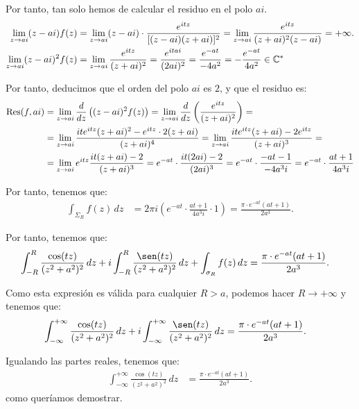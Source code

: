 \begin{ejercicio}
    Por tanto, tan solo hemos de calcular el residuo en el polo $ai$.
    \begin{align*}
        \lim_{z\to ai} (z - ai)f(z) &= \lim_{z\to ai} (z - ai)\cdot \frac{e^{i t z}}{[(z - ai)(z + ai)]^2}
        = \lim_{z\to ai} \frac{e^{i t z}}{(z + ai)^2(z - ai)} = +\infty.\\
        \lim_{z\to ai} (z - ai)^2f(z) &= \lim_{z\to ai} \frac{e^{i t z}}{(z + ai)^2}
        = \frac{e^{i t ai}}{(2ai)^2} = \frac{e^{-at}}{-4a^2} = -\frac{e^{-at}}{4a^2}\in \mathbb{C}^*
    \end{align*}

    Por tanto, deducimos que el orden del polo $ai$ es $2$, y que el residuo es:
    \begin{align*}
        \operatorname{Res}(f, ai) &= \lim_{z\to ai} \dfrac{d}{dz}\left((z - ai)^2f(z)\right)
        = \lim_{z\to ai} \dfrac{d}{dz}\left(\frac{e^{i t z}}{(z + ai)^2}\right)
        =\\&= \lim_{z\to ai} \frac{i t e^{i t z}(z + ai)^2 - e^{i t z}\cdot 2(z + ai)}{(z + ai)^4}
        = \lim_{z\to ai} \frac{i t e^{i t z}(z + ai) - 2e^{i t z}}{(z + ai)^3}
        =\\&=  \lim_{z\to ai} e^{i t z} \frac{i t (z + ai) - 2}{(z + ai)^3}
        = e^{-at}\cdot \dfrac{i t (2ai) - 2}{(2ai)^3}
        = e^{-at}\cdot \dfrac{-at -1}{-4a^3i}
        = e^{-at}\cdot \dfrac{at+1}{4a^3i}
    \end{align*}

    Por tanto, tenemos que:
    \begin{align*}
        \int_{\Sigma_R} f(z) \, dz &= 2\pi i\left(e^{-at}\cdot \frac{at + 1}{4a^3i} \cdot 1\right)
        = \frac{\pi\cdot e^{-at}(at + 1)}{2a^3}.
    \end{align*}

    Por tanto, tenemos que:
    \begin{align*}
        \int_{-R}^{R} \frac{\cos(t z)}{(z^2 + a^2)^2} \, dz + i\int_{-R}^{R} \frac{\sen(t z)}{(z^2 + a^2)^2} \, dz + \int_{\sigma_R} f(z) \, dz &= \frac{\pi\cdot e^{-at}(at + 1)}{2a^3}.
    \end{align*}

    Como esta expresión es válida para cualquier $R > a$, podemos hacer $R \to +\infty$ y tenemos que:
    \begin{align*}
        \int_{-\infty}^{+\infty} \frac{\cos(t z)}{(z^2 + a^2)^2} \, dz + i\int_{-\infty}^{+\infty} \frac{\sen(t z)}{(z^2 + a^2)^2} \, dz &= \frac{\pi\cdot e^{-at}(at + 1)}{2a^3}.
    \end{align*}

    Igualando las partes reales, tenemos que:
    \begin{align*}
        \int_{-\infty}^{+\infty} \frac{\cos(t z)}{(z^2 + a^2)^2} \, dz &= \frac{\pi\cdot e^{-at}(at + 1)}{2a^3}.
    \end{align*}
    como queríamos demostrar.
\end{ejercicio}


